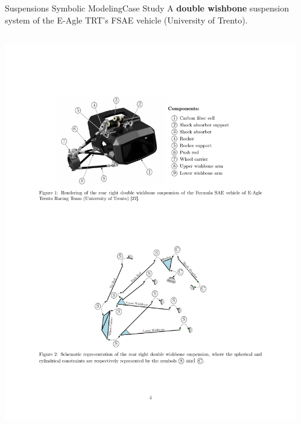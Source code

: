 \begin{frame}{Suspensions Symbolic Modeling}{Case Study}
  A \textbf{double wishbone} suspension system of the E-Agle TRT's FSAE vehicle (University of Trento). \\[1.0em]
  \begin{columns}
    \begin{column}[c]{0.65\textwidth}
      \centering
      \includegraphics[width=1.0\textwidth]{./figures/render_all.pdf}
    \end{column}
    \hspace*{1em}
    \begin{column}[c]{0.25\textwidth}
      \centering

\end{column}
\end{columns}
\end{frame}
